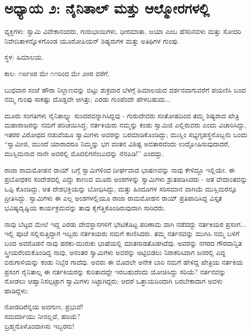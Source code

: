 
\chapter{ಅಧ್ಯಾಯ ೨: ನೈನಿತಾಲ್ ಮತ್ತು ಆಲ್ಮೋರಗಳಲ್ಲಿ}

ವ್ಯಕ್ತಿಗಳು: ಸ್ವಾಮಿ ವಿವೇಕಾನಂದರು, ಗುರುಭಾಯಿಗಳು, ಧೀರಮಾತಾ, ಜಯಾ ಎಂಬ ಹೆಸರಿನವಳು ಮತ್ತು ಸೋದರಿ ನಿವೇದಿತಾಳನ್ನೊಳಗೊಂಡ ಯೂರೋಪಿಯನ್ ಶಿಷ್ಯರುಗಳ ಮತ್ತು ಅತಿಥಿಗಳ ಗುಂಪು.

ಸ್ಥಳ: ಹಿಮಾಲಯ.

ಕಾಲ: ೧೮೯೮ರ ಮೇ ೧೧ರಿಂದ ಮೇ ೨೫ರ ವರೆಗೆ.

ಬುಧವಾರ ಸಂಜೆ ಹೌರಾ ನಿಲ್ದಾಣವನ್ನು ಬಿಟ್ಟು ಶುಕ್ರವಾರ ಬೆಳಗ್ಗೆ ಹಿಮಾಲಯದ ದರ್ಶನವಾಗುವರೆಗೆ ಪಯಣಿಸಿ ಬಂದ ನಮ್ಮ ಗುಂಪು ಸಾಕಷ್ಟು ದೊಡ್ಡದೇ ಆಗಿತ್ತು; ಎರಡು ಗುಂಪೆಂದೇ ಹೇಳಬಹುದು...

ಮೂರು ಸಂಗತಿಗಳು ನೈನಿತಾಲ್ನ್ನು ಸುಂದರವನ್ನಾಗಿಸಿದ್ದವು - ಗುರುದೇವರು ಸಂತೋಷದಿಂದ ತಮ್ಮ ಶಿಷ್ಯರಾದ ಖೇತ್ರಿ ಮಹಾರಾಜರನ್ನು ನಮಗೆ ಪರಿಚಯಿಸಿದ್ಧ; ನರ್ತಕಿಯರು ನಮ್ಮನ್ನು ಕಂಡು ಸ್ವಾಮಿಜಿ ಎಲ್ಲಿರುವರು ಎಂದು ವಿಚಾರಿಸಿದ್ದು, ಇತರರ ವಿರೋಧದ ನಡುವೆಯೂ ಸ್ವಾಮಿಗಳು ಅವರನ್ನು ಬರಮಾಡಿಕೊಂಡಿದ್ದು; ಮುಸ್ಲಿಂ ಸಭ್ಯಗೃಹಸ್ಥನೊಬ್ಬನು ಬಂದು “ಸ್ವಾಮೀಜಿ, ಮುಂದೆ ಯಾರಾದರೂ ನಿಮ್ಮನ್ನು ಭಗ ವಂತನ ವಿಶಿಷ್ಟ ಅವತಾರವೆಂದು ಉದ್ಘೋಷಿಸುವುದಾದರೆ, ಮುಸ್ಲಿಮನಾದ ನಾನೇ ಅವರಲ್ಲಿ ಮೊದಲಿಗನೆಂಬುದನ್ನು ನೆನಪಿಡಿ!” ಎಂದದ್ದು.

ರಾಜಾ ರಾಮಮೋಹನ ರಾಯ್​ ಬಗ್ಗೆ ಸ್ವಾಮಿಗಳಿಂದ ದೀರ್ಘವಾದ ಭಾಷಣವನ್ನು ನಾವು ಕೇಳಿದ್ದೂ ಇಲ್ಲಿಯೇ. ಈ ಪ್ರಬೋಧಕನ ಸಂದೇಶದಲ್ಲಿ ಎದ್ದು ಕಾಣುವ ಮೂರು ಅಂಶಗಳನ್ನು ಸ್ವಾಮಿಗಳು ಶ್ರುತಪಡಿಸಿದರು - ಆತ ವೇದಾಂತವನ್ನು ಒಪ್ಪಿ ಕೊಂಡಿದ್ದು, ಆತ ದೇಶಭಕ್ತಿಯನ್ನು ಬೋಧಿಸಿದ್ದು, ಮತ್ತು ಹಿಂದೂಗಳ ಸರಿಸಮಾನ ವಾಗಿಯೆ ಮುಸ್ಲಿಮರನ್ನೂ ಪ್ರೀತಿಸಿದ್ದು. ಸ್ವಾಮಿಗಳು ಈ ಎಲ್ಲ ಅಂಶಗಳಲ್ಲಿಯೂ ರಾಜಾ ರಾಮಮೋಹನ ರಾಯ್​ ಪ್ರತಿಪಾದಿಸಿದ್ದ ವಿಸ್ತೃತ ಭವಿಷ್ಯದೃಷ್ಟಿಯ ಕಾರ್ಯಕ್ರಮವನ್ನು ತಾವು ಕೈಗೆತ್ತಿಕೊಂಡಿರುವುದಾಗಿ ಸಾರಿದರು.

ನಾವು ಬೆಟ್ಟದ ಮೇಲೆ ಇದ್ದ ಎರಡು ದೇವಸ್ಥಾನಗಳಿಗೆ ಭೇಟಿಕೊಟ್ಟ ಪರಿಣಾಮ ವಾಗಿ ನಡೆದದ್ದು ನರ್ತಕಿಯರ ಪ್ರಸಂಗ... ಇಲ್ಲಿ ಪೂಜೆ ಸಲ್ಲಿಸುತ್ತಿದ್ದಾಗ ಇಬ್ಬರು ನರ್ತಕಿಯರು ನಮಗೆ ಕಾಣಿಸಿದರು. ತಮ್ಮ ನರ್ತನವನ್ನು ಮುಗಿಸಿ ನಮ್ಮ ಬಳಿಗೆ ಬಂದ ಅವರೊಡನೆ ನಾವು ಹರಕು-ಮುರುಕು ಭಾಷೆಯಲ್ಲಿ ಮಾತನಾಡತೊಡಗಿದೆವು. ಅವರನ್ನು ನಗರದ ಗೌರವಾನ್ವಿತ ಸ್ತ್ರೀಯರೆಂದುಕೊಂಡಿದ್ದ ನಾವು, ಅನಂತರ ಸ್ವಾಮಿಗಳು ಅವರನ್ನು ಅಟ್ಟಿಬಿಡಲು ನಿರಾಕರಿಸಿದಾಗ ಜನರಲ್ಲಿ ಎದ್ದ ಬಿರುಗಾಳಿಯನ್ನು ಕಂಡು ನಿಬ್ಬೆರ ಗಾದೆವು. ಅವರು ಈ ಮೊದಲೇ ಅನೇಕ ಬಾರಿ ನಮಗೆ ಹೇಳಿದ್ದ ಖೇತ್ರಿಯ ನರ್ತಕಿಯ ಪ್ರಸಂಗ ನೈನಿತಾಲ್ನ ಈ ನರ್ತಕಿಯರನ್ನು ಕುರಿತಾದದ್ದೇ ಇರಬಹುದೆಂದು ಯೋಚಿಸಿದ್ದು ಸರಿಯೆ? ನರ್ತನವನ್ನು ನೋಡಲು ಆಹ್ವಾನಿಸಲ್ಪಟ್ಟಾಗ ಸ್ವಾಮಿಗಳು ಸಿಟ್ಟಾಗಿದ್ದರು; ಆದರೆ ಒತ್ತಾಯದಿಂದಾಗಿ ಬರಬೇಕಾದಾಗ ಅವಳು ಹಾಡಿದ್ದಳು:

\begin{myquote}
ನೋಡದಿರೆನ್ನಯ ಅವಗುಣ, ಪ್ರಭುವೆ!\\ಸಮದರ್ಶಿಯು ನೀನಲ್ಲವೆ, ಹರಿಯೆ?\\ಬ್ರಹ್ಮನೊಳೊಂದಾಗಿಸು ಇಬ್ಬರನು!
\end{myquote}

